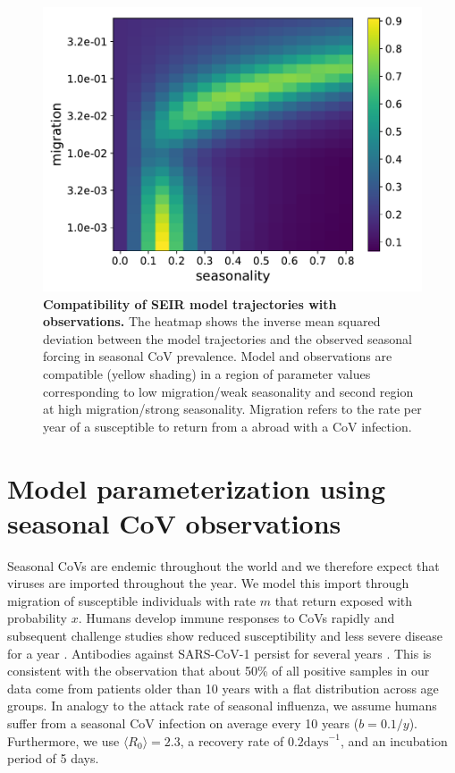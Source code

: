 \documentclass[rmp, reprint, superscriptaddress, floatfix,amsmath]{revtex4-1}
\begin{document}
\begin{figure}
    \centering
    \includegraphics[width=\columnwidth]{figures/fig_2.pdf}
    \caption{{\bf Compatibility of SEIR model trajectories with observations.} The heatmap shows the inverse mean squared deviation between the model trajectories and the observed seasonal forcing in seasonal CoV prevalence. Model and observations are compatible (yellow shading) in a region of parameter values corresponding to low migration/weak seasonality and second region at high migration/strong seasonality. Migration refers to the rate per year of a susceptible to return from a abroad with a CoV infection.}
    \label{fig:parameter_seasonal}
\end{figure}

\section{Model parameterization using seasonal CoV observations}
Seasonal CoVs are endemic throughout the world and we therefore expect that viruses are imported throughout the year.
We model this import through migration of susceptible individuals with rate $m$ that return exposed with probability $x$.
Humans develop immune responses to CoVs rapidly and subsequent challenge studies show reduced susceptibility and less severe disease for a year \citep{callow_time_1990}.
Antibodies against SARS-CoV-1 persist for several years \citep{guo_long-term_2020}.
This is consistent with the observation that about 50\% of all positive samples in our data come from patients older than 10 years with a flat distribution across age groups.
In analogy to the attack rate of seasonal influenza, we assume humans suffer from a seasonal CoV infection on average every 10 years ($b=0.1/y$).
Furthermore, we use $\langle R_0\rangle=2.3$, a recovery rate of $0.2 \mathrm{days}^{-1}$, and an incubation period of 5 days.
\end{document}
